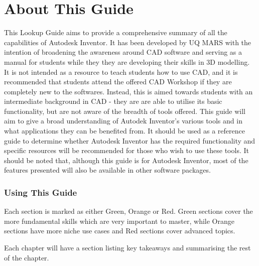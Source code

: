\chapter{About This Guide}

This Lookup Guide aims to provide a comprehensive summary of all the capabilities of Autodesk Inventor. It has been developed by UQ MARS with the intention of broadening the awareness around CAD software and serving as a manual for students while they they are developing their skills in 3D modelling. It is not intended as a resource to teach students how to use CAD, and it is recommended that students attend the offered CAD Workshop if they are completely new to the softwares. Instead, this is aimed towards students with an intermediate background in CAD - they are are able to utilise its basic functionality, but are not aware of the breadth of tools offered. This guide will aim to give a broad understanding of Autodek Inventor's various tools and in what applications they can be benefited from. It should be used as a reference guide to determine whether Autodesk Inventor has the required functionality and specific resources will be recommended for those who wish to use these tools. It should be noted that, although this guide is for Autodesk Inventor, most of the features presented will also be available in other software packages.

\subsection{Using This Guide}
Each section is marked as either Green, Orange or Red. Green sections cover the more fundamental skills which are very important to master, while Orange sections have more niche use cases and Red sections cover advanced topics. 

Each chapter will have a section listing key takeaways and summarising the rest of the chapter. 